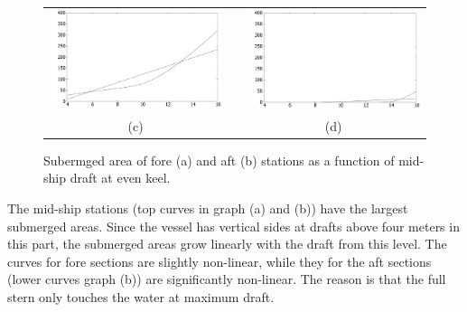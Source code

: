 \documentclass[runningheads]{llncs}
\begin{document}
\begin{figure}[h!]
\begin{tabular}{ccc}
 \includegraphics[scale=0.14]{figures/BonjeanLinear1} &  &   \includegraphics[scale=0.14]{figures/BonjeanLinear2} \\
          (c)                              &  &                   (d)   
  \end{tabular}
  \caption{Subermged area of fore (a) and aft (b) stations as a function of mid-ship draft at even keel.}\label{fig:Bonjean}
\end{figure}

The mid-ship stations (top curves in graph (a) and (b)) have the largest submerged areas. Since the vessel has vertical sides at drafts above four meters in this part, the submerged areas grow linearly with the draft from this level. The curves for fore sections are slightly non-linear, while they for the aft sections (lower curves graph (b)) are significantly non-linear. The reason is that the full stern only touches the water at maximum draft. 
\end{document}
